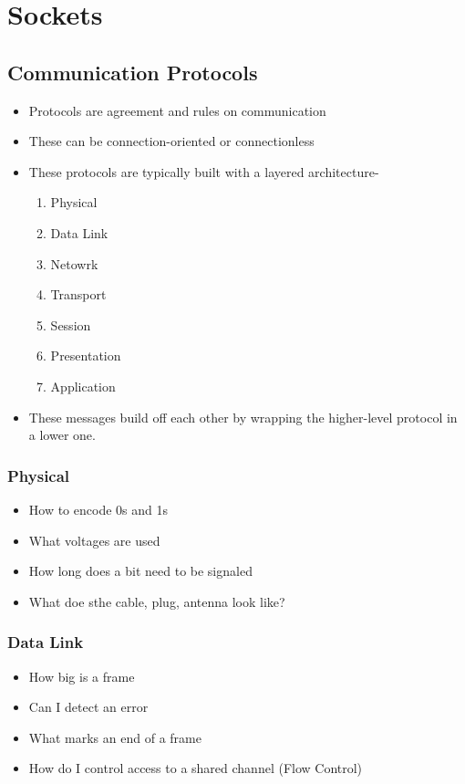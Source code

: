 \section{Sockets}\label{sec:Sockets}
\subsection{Communication Protocols}\label{subsec:Communication_Protocols}
\begin{itemize}
\item Protocols are agreement and rules on communication
\item These can be connection-oriented or connectionless
\item These protocols are typically built with a layered architecture-
\begin{enumerate}
\item Physical
\item Data Link
\item Netowrk
\item Transport
\item Session
\item Presentation
\item Application
\end{enumerate}
\item These messages build off each other by wrapping the higher-level protocol in a lower one.
\end{itemize}

\subsubsection{Physical}\label{subsubsec:Physical_Protocols}
\begin{itemize}
\item How to encode 0s and 1s
\item What voltages are used
\item How long does a bit need to be signaled
\item What doe sthe cable, plug, antenna look like?
\end{itemize}

\subsubsection{Data Link}\label{subsubsec:Data_Link_Protocols}
\begin{itemize}
\item How big is a frame
\item Can I detect an error
\item What marks an end of a frame
\item How do I control access to a shared channel (Flow Control)
\end{itemize}

